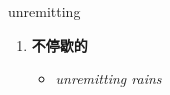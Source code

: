 
\begin{frame}
{\huge unremitting}
\begin{center}
\begin{enumerate}\Large
  \item \textbf{不停歇的}
  \begin{itemize}
    \item \em{\Large{unremitting rains}}
  \end{itemize}
\end{enumerate}
\end{center}
\end{frame}
